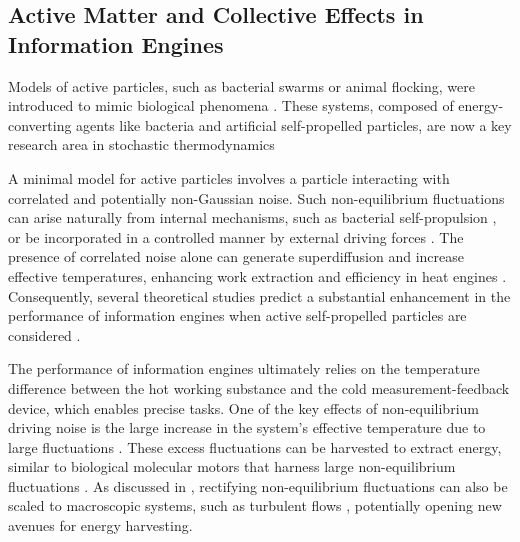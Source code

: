 \documentclass[aps, twocolumn,floatfix,showpacs, superscriptaddress]{revtex4-2}
\newcommand{\ie}{information engines }
\newcommand{\IE}{Information Engines }
\begin{document}
\subsection{Active Matter and Collective Effects in \IE}

Models of active particles, such as bacterial swarms or animal flocking, were introduced to mimic biological phenomena \cite{vicsek1995novel, solon2024thirty}. These systems, composed of energy-converting agents like bacteria and artificial self-propelled particles, are now a key research area in stochastic thermodynamics \cite{ramaswamy2010mechanics, fodor2018statistical, fodor2016far, fodor2021active, Albay2O23, davis2024active}

A minimal model for active particles involves a particle interacting with correlated and potentially non-Gaussian noise. Such non-equilibrium fluctuations can arise naturally from internal mechanisms, such as bacterial self-propulsion \cite{di_leonardo_bacterial_2010}, or be incorporated in a controlled manner by external driving forces \cite{Goerlich2022, saha2023information}. The presence of correlated noise alone can generate superdiffusion and increase effective temperatures, enhancing work extraction and efficiency in heat engines \cite{holubec2020active, krishnamurthy2016micrometre, martinez_colloidal_2017}.
Consequently, several theoretical studies predict a substantial enhancement in the performance of \ie when active self-propelled particles are considered \cite{paneru_optimal_2018, paneru_colossal_2022, malgaretti_szilard_2022, cocconi_efficiency_2024, rafeek2024active, garcia2024optimal}.

The performance of \ie ultimately relies on the temperature difference between the hot working substance and the cold measurement-feedback device, which enables precise tasks. One of the key effects of non-equilibrium driving noise is the large increase in the system's effective temperature due to large fluctuations \cite{Goerlich2022, di_leonardo_bacterial_2010}. These excess fluctuations can be harvested to extract energy, similar to biological molecular motors that harness large non-equilibrium fluctuations \cite{ariga2021noise}. As discussed in \cite{saha2023information}, rectifying non-equilibrium fluctuations can also be scaled to macroscopic systems, such as turbulent flows \cite{francois2020nonequilibrium}, potentially opening new avenues for energy harvesting.
\end{document}
